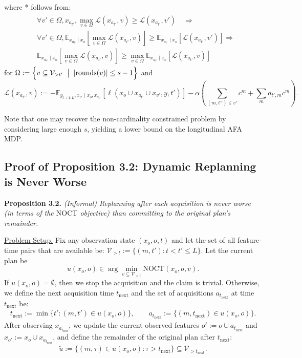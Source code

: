 where * follows from:
\[
\begin{aligned}
&\begin{array}{r}
\forall v' \in \Omega, x_{a_{t'}}, \max\limits_{v \in \Omega} \mathcal{L}\left(x_{a_{t'}}, v\right) \geq \mathcal{L}\left(x_{a_{t'}}, v'\right) \quad \Longrightarrow \\[0.8em]
\forall v'\in \Omega, \mathbb{E}_{x_{a_{t'}} \mid x_o}\left[\max\limits _{v \in \Omega} \mathcal{L}\left(x_{a_{t'}}, v\right)\right] \geq \mathbb{E}_{x_{a_{t'}} \mid x_o}\left[\mathcal{L}\left(x_{a_{t'}}, v'\right)\right] \Longrightarrow \\[0.8em]
\mathbb{E}_{x_{a_{t'}} \mid x_o}\left[\max\limits _{v \in \Omega} \mathcal{L}\left(x_{a_{t'}}, v\right)\right] \geq \max\limits _{v \in \Omega} \mathbb{E}_{x_{a_{t'}} \mid x_o}\left[\mathcal{L}\left(x_{a_{t'}}, v\right)\right]
\end{array}
\end{aligned}
\]
for $\Omega :=\Bigl\{v\subseteq\mathcal V_{>t'}\;\bigm|\; |\text{rounds}(v)|\le s-1\Bigr\}$ and 
\[
\mathcal{L} (x_{a_{t'}}, v) := 
- \mathbb{E}_{y_{t+1:L}, x_{v'} \mid {x}_{o}, x_{a_{t'}} }[\ell (x_o \cup x_{a_{t'}}\cup x_{v'}, y, t')] - \alpha  \left(\sum_{(m, t'') \in v'} \!\!\!\! c^m + \sum_{m} a_{t',m}c^m \right ).
\]

Note that one
may recover the non-cardinality constrained problem by considering large enough $s$, yielding a lower bound on the longitudinal AFA MDP.

\subsection{Proof of Proposition 3.2: Dynamic Replanning is Never Worse}
\label{appendex:proposition1}
\textbf{Proposition 3.2.} \emph{(Informal) Replanning after each acquisition is never worse (in terms of the $\mathrm{NOCT}$ objective) than committing to the original plan’s remainder.}


\uline{Problem Setup.} Fix any observation state $(x_o,o,t)$ and let the set of all feature-time pairs that are available be:  $\mathcal{V}_{>t} := \{(m,t') : t < t' \le L\}$.
Let the current plan be
\[
u(x_o,o) \in \arg\min_{v \subseteq \mathcal{V}_{>t}} \mathrm{NOCT}(x_o,o,v).
\]
If $u(x_o,o)=\emptyset$, then we stop the acquisition and the claim is trivial. Otherwise, we define the next acquisition time $t_\text{next}$ and the set of acquisitions $a_{t_{\text{next}}}$ at time $t_{\text{next}}$ be:
\begin{align*}
t_{\text{next}} := \min\{t' : (m,t') \in u(x_o,o)\}, 
\qquad
a_{t_{\text{next}}} := \{(m,t_{\text{next}})\in u(x_o,o)\}.
\end{align*}
After observing $x_{a_{t_{\text{next}}}}$, we update the current observed features $o':=o\cup a_{t_{\text{next}}}$ and
$x_{o'}:=x_o\cup x_{a_{t_{\text{next}}}}$,
and define the remainder of the original plan after $t_{\text{next}}$:
\begin{align*}
\tilde u := \{(m,\tau)\in u(x_o,o) : \tau > t_{\text{next}}\} \subseteq \mathcal{V}_{>t_{\text{next}}}.
\end{align*}

